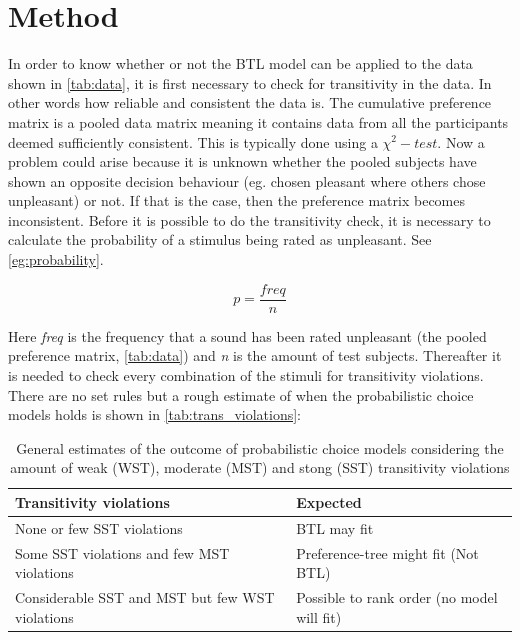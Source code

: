 \section*{Method}
\label{Method}
%
In order to know whether or not the BTL model can be applied to the data shown in \autoref{tab:data}, it is first necessary to check for transitivity in the data. In other words how reliable and consistent the data is. The cumulative preference matrix is a pooled data matrix meaning it contains data from all the participants deemed sufficiently consistent. This is typically done using a $\chi^{2}-test$. Now a problem could arise because it is unknown whether the pooled subjects have shown an opposite decision behaviour (eg. chosen pleasant where others chose unpleasant) or not. If that is the case, then the preference matrix becomes inconsistent. Before it is possible to do the transitivity check, it is necessary to calculate the probability of a stimulus being rated as unpleasant. See \autoref{eg:probability}.

\begin{equation}
p = \frac{freq}{n}
\end{equation}

Here \textit{freq} is the frequency that a sound has been rated unpleasant (the pooled preference matrix, \autoref{tab:data}) and \textit{n} is the amount of test subjects. Thereafter it is needed to check every combination of the stimuli for transitivity violations. There are no set rules but a rough estimate of when the probabilistic choice models holds is shown in \autoref{tab:trans_violations}:

\begin{table}[H]
\centering
\begin{tabular}{@{}ll@{}}
\toprule
Transitivity violations                                    & Expected                                      \\ \midrule
None or few SST violations                                 & BTL may fit                                   \\
Some SST violations and few MST violations                 & Preference-tree might fit (Not BTL)            \\
Considerable SST and MST but few WST violations & Possible to rank order (no model will fit) \\ \bottomrule
\end{tabular}
\caption{General estimates of the outcome of probabilistic choice models considering the amount of weak (WST), moderate (MST) and stong (SST) transitivity violations}
\label{tab:trans_violations}
\end{table}

